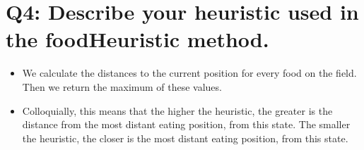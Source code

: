 \section{Q4: Describe your heuristic used in the foodHeuristic method.}
\begin{itemize}
    \item We calculate the distances to the current position for every food on the field.
    Then we return the maximum of these values.
    \item Colloquially, this means that the higher the heuristic, the greater is the distance from the most distant eating position, from this state. The smaller the heuristic, the closer is the most distant eating position, from this state.
\end{itemize}

